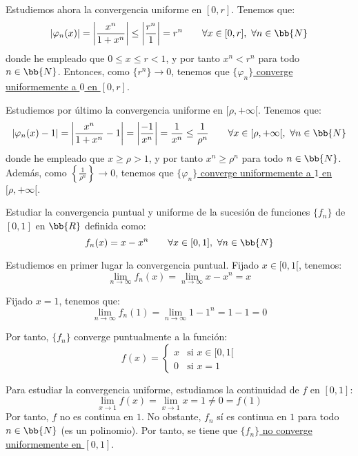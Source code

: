 \begin{ejercicio}
    Estudiemos ahora la convergencia uniforme en $[0,r]$. Tenemos que:
    \begin{equation*}
        \left|\varphi_n(x)\right| = \left|\frac{x^n}{1+x^n}\right| \leq \left|\frac{r^n}{1}\right| = r^n \qquad \forall x\in [0,r],~\forall n\in \bb{N}
    \end{equation*}
    donde he empleado que $0\leq x\leq r<1$, y por tanto $x^n < r^n$ para todo $n\in \bb{N}$.
    Entonces, como $\{r^n\}\to 0$, tenemos que \ul{$\{\varphi_n\}$ converge uniformemente a $0$ en $[0,r]$}.

    Estudiemos por último la convergencia uniforme en $[\rho,+\infty[$. Tenemos que:
    \begin{equation*}
        \left|\varphi_n(x)-1\right| = \left|\frac{x^n}{1+x^n}-1\right| = \left|\frac{-1}{x^n}\right|
        = \frac{1}{x^n} \leq \frac{1}{\rho^n} \qquad \forall x\in [\rho,+\infty[,~\forall n\in \bb{N}
    \end{equation*}
    donde he empleado que $x\geq \rho>1$, y por tanto $x^n \geq \rho^n$ para todo $n\in \bb{N}$. Además,
    como $\left\{\frac{1}{\rho^n}\right\}\to 0$, tenemos que \ul{$\{\varphi_n\}$ converge uniformemente a $1$ en $[\rho,+\infty[$}.
\end{ejercicio}


\begin{ejercicio}
    Estudiar la convergencia puntual y uniforme de la sucesión de funciones $\{f_n\}$ de $[0,1]$ en $\bb{R}$ definida como:
    \begin{equation*}
        f_n(x) = x-x^n \qquad \forall x\in [0,1],~\forall n\in \bb{N}
    \end{equation*}

    Estudiemos en primer lugar la convergencia puntual. Fijado $x\in [0,1[$, tenemos:
    \begin{equation*}
        \lim_{n\to \infty} f_n(x) = \lim_{n\to \infty} x-x^n = x
    \end{equation*}

    Fijado $x=1$, tenemos que:
    \begin{equation*}
        \lim_{n\to \infty} f_n(1) = \lim_{n\to \infty} 1-1^n = 1-1=0
    \end{equation*}

    Por tanto, $\{f_n\}$ converge puntualmente a la función:
    \begin{equation*}
        f(x) = \begin{cases}
            x & \text{si } x\in [0,1[\\
            0 & \text{si } x=1
        \end{cases}
    \end{equation*}

    Para estudiar la convergencia uniforme, estudiamos la continuidad de $f$ en $[0,1]$:
    \begin{equation*}
        \lim_{x\to 1}f(x) = \lim_{x\to 1}x = 1 \neq 0 = f(1)
    \end{equation*}
    Por tanto, $f$ no es continua en $1$. No obstante, $f_n$ sí es continua en $1$ para todo $n\in \bb{N}$ (es un polinomio). Por tanto, se tiene que \ul{$\{f_n\}$ no converge uniformemente en $[0,1]$}.
\end{ejercicio}


